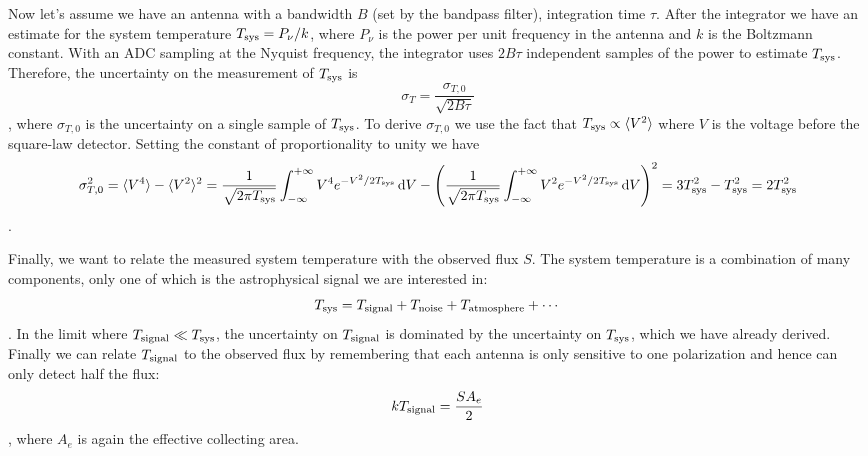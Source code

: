 \begin{enumerate}
      Now let's assume we have an antenna with a bandwidth $B$ (set by the bandpass filter),
      integration time $\tau$.  After the integrator we have an estimate for the system
      temperature $T_{\rm sys} = P_\nu/k$, where $P_\nu$ is the power per unit frequency in the
      antenna and $k$ is the Boltzmann constant.  With an ADC sampling at the Nyquist frequency,
      the integrator uses $2B\tau$ independent samples of the power to estimate $T_{\rm sys}$.
      Therefore, the uncertainty on the measurement of $T_{\rm sys}$ is
      \begin{dmath*}
        \sigma_T = \frac{\sigma_{T,0}}{\sqrt{2B\tau}}
      \end{dmath*},
      where $\sigma_{T,0}$ is the uncertainty on a single sample of $T_{\rm sys}$.  To derive
      $\sigma_{T,0}$ we use the fact that $T_{\rm sys} \propto \langle V^2\rangle$ where $V$
      is the voltage before the square-law detector.  Setting the constant of proportionality
      to unity we have
      \begin{dmath*}
        \sigma_{T,0}^2 = \langle V^4\rangle - \langle V^2\rangle^2
                       = \frac{1}{\sqrt{2\pi T_{\rm sys}}}\int_{-\infty}^{+\infty} V^4e^{-V^2/2T_{\rm sys}}\,\d V
                       - \left(\frac{1}{\sqrt{2\pi T_{\rm sys}}}\int_{-\infty}^{+\infty} V^2e^{-V^2/2T_{\rm sys}}\,\d V\right)^2
                       = 3T_{\rm sys}^2 - T_{\rm sys}^2 \nolinebreak = 2T_{\rm sys}^2
      \end{dmath*}.

      Finally, we want to relate the measured system temperature with the observed flux $S$.
      The system temperature is a combination of many components, only one of which is the
      astrophysical signal we are interested in:
      \begin{dmath}
        T_{\rm sys} = T_{\rm signal} + T_{\rm noise} + T_{\rm atmosphere} + \cdots
      \end{dmath}.
      In the limit where $T_{\rm signal} \ll T_{\rm sys}$, the uncertainty on $T_{\rm signal}$
      is dominated by the uncertainty on $T_{\rm sys}$, which we have already derived.
      Finally we can relate $T_{\rm signal}$ to the observed flux by remembering that each
      antenna is only sensitive to one polarization and hence can only detect half the flux:
      \begin{dmath}
        kT_{\rm signal} = \frac{SA_e}{2}
      \end{dmath},
      where $A_e$ is again the effective collecting area.


\end{enumerate}
